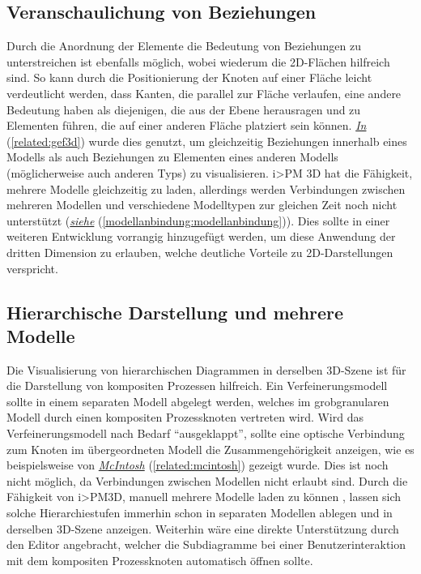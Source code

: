 \documentclass[a4paper,10pt]{sphinxmanual}
\begin{document}
\subsection{Veranschaulichung von Beziehungen}
\label{visualisierung:veranschaulichung-von-beziehungen}
Durch die Anordnung der Elemente die Bedeutung von Beziehungen zu unterstreichen ist ebenfalls möglich, wobei wiederum die 2D-Flächen hilfreich sind.
So kann durch die Positionierung der Knoten auf einer Fläche leicht verdeutlicht werden, dass Kanten, die parallel zur Fläche verlaufen, eine andere Bedeutung haben als diejenigen, die aus der Ebene herausragen und zu Elementen führen, die auf einer anderen Fläche platziert sein können.
{\hyperref[related:gef3d]{\emph{In}}} (\autoref*{related:gef3d}) wurde dies genutzt, um gleichzeitig Beziehungen innerhalb eines Modells als auch Beziehungen zu Elementen eines anderen Modells (möglicherweise auch anderen Typs) zu visualisieren.
i\textgreater{}PM 3D hat die Fähigkeit, mehrere Modelle gleichzeitig zu laden, allerdings werden Verbindungen zwischen mehreren Modellen und verschiedene Modelltypen zur gleichen Zeit noch nicht unterstützt ({\hyperref[modellanbindung:modellanbindung]{\emph{siehe}}} (\autoref*{modellanbindung:modellanbindung})).
Dies sollte in einer weiteren Entwicklung vorrangig hinzugefügt werden, um diese Anwendung der dritten Dimension zu erlauben, welche deutliche Vorteile zu 2D-Darstellungen verspricht.


\subsection{Hierarchische Darstellung und mehrere Modelle}
\label{visualisierung:hierarchische-darstellung-und-mehrere-modelle}
Die Visualisierung von hierarchischen Diagrammen in derselben 3D-Szene ist für die Darstellung von kompositen Prozessen hilfreich.
Ein Verfeinerungsmodell sollte in einem separaten Modell abgelegt werden, welches im grobgranularen Modell durch einen kompositen Prozessknoten vertreten wird.
Wird das Verfeinerungsmodell nach Bedarf "`ausgeklappt"', sollte eine optische Verbindung zum Knoten im übergeordneten Modell die Zusammengehörigkeit anzeigen, wie es beispielsweise von {\hyperref[related:mcintosh]{\emph{McIntosh}}} (\autoref*{related:mcintosh}) gezeigt wurde.
Dies ist noch nicht möglich, da Verbindungen zwischen Modellen nicht erlaubt sind.
Durch die Fähigkeit von i\textgreater{}PM3D, manuell mehrere Modelle laden zu können \cite{uli}, lassen sich solche Hierarchiestufen immerhin schon in separaten Modellen ablegen und in derselben 3D-Szene anzeigen.
Weiterhin wäre eine direkte Unterstützung durch den Editor angebracht, welcher die Subdiagramme bei einer Benutzerinteraktion mit dem kompositen Prozessknoten automatisch öffnen sollte.
\end{document}

